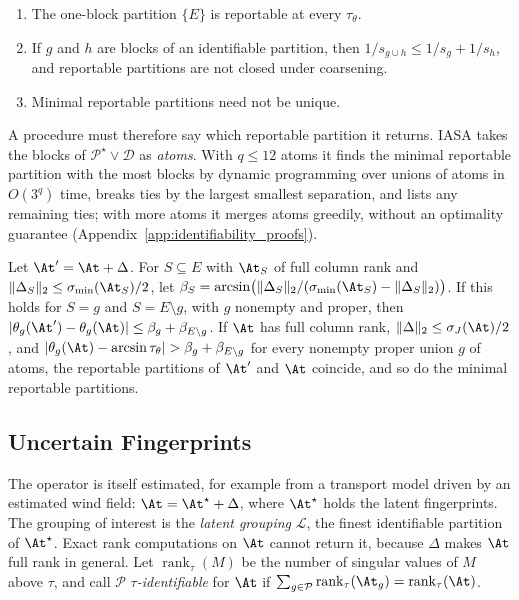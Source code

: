\begin{proposition}
\label{prop:reportable_structure}
\leavevmode
\begin{enumerate}[label=(\alph*),leftmargin=*,itemsep=0pt,topsep=2pt]
  \item The one-block partition \(\{E\}\) is reportable at every \(\tau_\theta\).
  \item If \(g\) and \(h\) are blocks of an identifiable partition, then
  \(1/s_{g\cup h}\le1/s_g+1/s_h\), and reportable partitions are not closed under
  coarsening.
  \item Minimal reportable partitions need not be unique.
\end{enumerate}
\end{proposition}

A procedure must therefore say which reportable partition it returns.  IASA takes the
blocks of \(\mathcal P^\star\vee\mathcal D\) as \emph{atoms}.  With \(q\le12\) atoms it finds
the minimal reportable partition with the most blocks by dynamic programming over unions
of atoms in \(O(3^q)\) time, breaks ties by the largest smallest separation, and lists any
remaining ties; with more atoms it merges atoms greedily, without an optimality guarantee
(Appendix~\ref{app:identifiability_proofs}).

\begin{proposition}
\label{prop:grouping_stability}
Let \(\At'=\At+\Delta\).  For \(S\subseteq E\) with \(\At_S\) of full column rank and
\(\|\Delta_S\|_2\le\sigma_{\min}(\At_S)/2\), let
\(\beta_S=\arcsin\bigl(\|\Delta_S\|_2/(\sigma_{\min}(\At_S)-\|\Delta_S\|_2)\bigr)\).
If this holds for \(S=g\) and \(S=E\setminus g\), with \(g\) nonempty and proper, then
\(|\theta_g(\At')-\theta_g(\At)|\le\beta_g+\beta_{E\setminus g}\).  If \(\At\) has full
column rank, \(\|\Delta\|_2\le\sigma_J(\At)/2\), and
\(|\theta_g(\At)-\arcsin\tau_\theta|>\beta_g+\beta_{E\setminus g}\) for every nonempty
proper union \(g\) of atoms, the reportable partitions of \(\At'\) and \(\At\) coincide,
and so do the minimal reportable partitions.
\end{proposition}

\subsection{Uncertain Fingerprints}
\label{subsec:uncertain_fingerprints}

The operator is itself estimated, for example from a transport model driven by an
estimated wind field: \(\At=\At^\star+\Delta\), where \(\At^\star\) holds the latent
fingerprints.  The grouping of interest is the \emph{latent grouping} \(\mathcal L\),
the finest identifiable partition of \(\At^\star\).  Exact rank computations on
\(\At\) cannot return it, because \(\Delta\) makes \(\At\) full rank in general.  Let
\(\operatorname{rank}_\tau(M)\) be the number of singular values of \(M\) above
\(\tau\), and call \(\mathcal P\) \emph{\(\tau\)-identifiable} for \(\At\) if
\(\sum_{g\in\mathcal P}\operatorname{rank}_\tau(\At_g)=\operatorname{rank}_\tau(\At)\).

